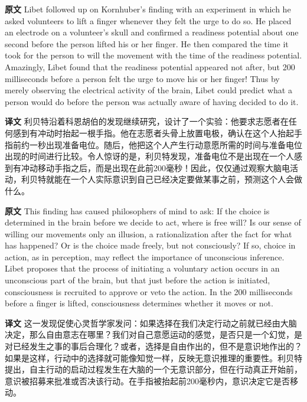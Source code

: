 \documentclass[UTF8]{ctexart}
\newenvironment{english}{\par\small\noindent\textbf{原文}\quad\ignorespaces}{\par}
\newenvironment{zhtranslation}{\par\noindent\textbf{译文}\quad\ignorespaces}{\par\vspace{0.35em}}
\begin{document}
\begin{english}
Libet followed up on Kornhuber's finding with an experiment in which he asked volunteers to lift a finger whenever they felt the urge to do so. He placed an electrode on a volunteer's skull and confirmed a readiness potential about one second before the person lifted his or her finger. He then compared the time it took for the person to will the movement with the time of the readiness potential. Amazingly, Libet found that the readiness potential appeared not after, but 200 milliseconds before a person felt the urge to move his or her finger! Thus by merely observing the electrical activity of the brain, Libet could predict what a person would do before the person was actually aware of having decided to do it.
\end{english}
\begin{zhtranslation}
利贝特沿着科恩胡伯的发现继续研究，设计了一个实验：他要求志愿者在任何感到有冲动时抬起一根手指。他在志愿者头骨上放置电极，确认在这个人抬起手指前约一秒出现准备电位。随后，他把这个人产生行动意愿所需的时间与准备电位出现的时间进行比较。令人惊讶的是，利贝特发现，准备电位不是出现在一个人感到有冲动移动手指之后，而是出现在此前200毫秒！因此，仅仅通过观察大脑电活动，利贝特就能在一个人实际意识到自己已经决定要做某事之前，预测这个人会做什么。\end{zhtranslation}

\begin{english}
This finding has caused philosophers of mind to ask: If the choice is determined in the brain before we decide to act, where is free will? Is our sense of willing our movements only an illusion, a rationalization after the fact for what has happened? Or is the choice made freely, but not consciously? If so, choice in action, as in perception, may reflect the importance of unconscious inference. Libet proposes that the process of initiating a voluntary action occurs in an unconscious part of the brain, but that just before the action is initiated, consciousness is recruited to approve or veto the action. In the 200 milliseconds before a finger is lifted, consciousness determines whether it moves or not.
\end{english}
\begin{zhtranslation}
这一发现促使心灵哲学家发问：如果选择在我们决定行动之前就已经由大脑决定，那么自由意志在哪里？我们对自己意愿运动的感觉，是否只是一个幻觉，是对已经发生之事的事后合理化？或者，选择是自由作出的，但不是意识地作出的？如果是这样，行动中的选择就可能像知觉一样，反映无意识推理的重要性。利贝特提出，自主行动的启动过程发生在大脑的一个无意识部分，但在行动真正开始前，意识被招募来批准或否决该行动。在手指被抬起前200毫秒内，意识决定它是否移动。\end{zhtranslation}
\end{document}
